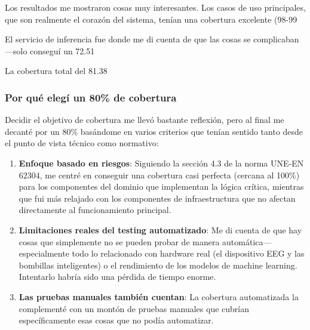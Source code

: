 Los resultados me mostraron cosas muy interesantes. Los casos de uso principales, que son realmente el corazón del sistema, tenían una cobertura excelente (98-99%

El servicio de inferencia fue donde me di cuenta de que las cosas se complicaban—solo conseguí un 72.51%

La cobertura total del 81.38%

\subsubsection{Por qué elegí un 80\% de cobertura}

Decidir el objetivo de cobertura me llevó bastante reflexión, pero al final me decanté por un 80\% basándome en varios criterios que tenían sentido tanto desde el punto de vista técnico como normativo:

\begin{enumerate}
    \item \textbf{Enfoque basado en riesgos}: Siguiendo la sección 4.3 de la norma UNE-EN 62304, me centré en conseguir una cobertura casi perfecta (cercana al 100\%) para los componentes del dominio que implementan la lógica crítica, mientras que fui más relajado con los componentes de infraestructura que no afectan directamente al funcionamiento principal.
    
    \item \textbf{Limitaciones reales del testing automatizado}: Me di cuenta de que hay cosas que simplemente no se pueden probar de manera automática—especialmente todo lo relacionado con hardware real (el dispositivo EEG y las bombillas inteligentes) o el rendimiento de los modelos de machine learning. Intentarlo habría sido una pérdida de tiempo enorme.
    
    \item \textbf{Las pruebas manuales también cuentan}: La cobertura automatizada la complementé con un montón de pruebas manuales que cubrían específicamente esas cosas que no podía automatizar.
\end{enumerate}

